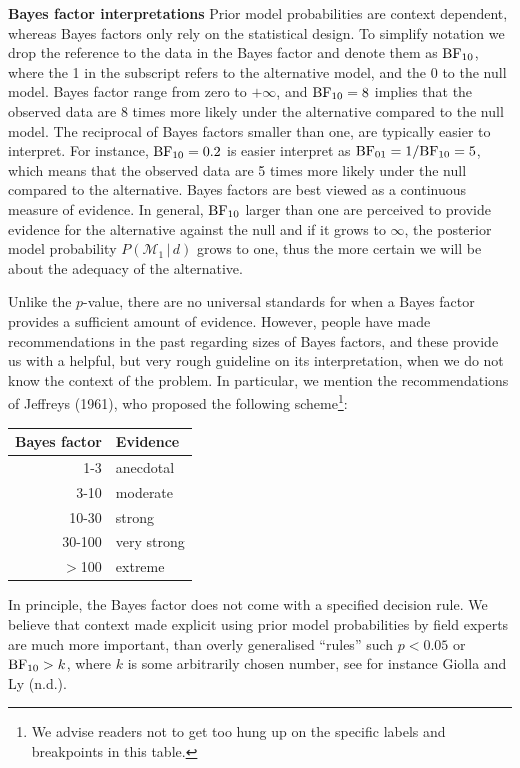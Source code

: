 \documentclass[english,,doc,floatsintext]{apa6}
\let\rmarkdownfootnote\footnote%
\def\footnote{\protect\rmarkdownfootnote}
\begin{document}
\textbf{Bayes factor interpretations}
Prior model probabilities are context dependent, whereas Bayes factors only rely on the statistical design. To simplify notation we drop the reference to the data in the Bayes factor and denote them as \(\textnormal{BF}_{10}\), where the 1 in the subscript refers to the alternative model, and the 0 to the null model. Bayes factor range from zero to \(+ \infty\), and \(\textnormal{BF}_{10} = 8\) implies that the observed data are 8 times more likely under the alternative compared to the null model. The reciprocal of Bayes factors smaller than one, are typically easier to interpret. For instance, \(\textnormal{BF}_{10} = 0.2\) is easier interpret as \(\textnormal{BF}_{01} = 1/\textnormal{BF}_{10} = 5\), which means that the observed data are 5 times more likely under the null compared to the alternative. Bayes factors are best viewed as a continuous measure of evidence. In general, \(\textnormal{BF}_{10}\) larger than one are perceived to provide evidence for the alternative against the null and if it grows to \(\infty\), the posterior model probability \(P(\mathcal{M}_{1} \, | \, d)\) grows to one, thus the more certain we will be about the adequacy of the alternative.

Unlike the \(p\)-value, there are no universal standards for when a Bayes factor provides a sufficient amount of evidence. However, people have made recommendations in the past regarding sizes of Bayes factors, and these provide us with a helpful, but very rough guideline on its interpretation, when we do not know the context of the problem. In particular, we mention the recommendations of Jeffreys (1961), who proposed the following scheme\footnote{We advise readers not to get too hung up on the specific labels and breakpoints in this table.}:

\begin{tabular}{rl}
Bayes factor & Evidence\\
\hline
1-3 & anecdotal\\
3-10 & moderate\\
10-30 & strong\\
30-100 & very strong\\
\( > \)100 & extreme\\
\end{tabular}

In principle, the Bayes factor does not come with a specified decision rule. We believe that context made explicit using prior model probabilities by field experts are much more important, than overly generalised \enquote{rules} such \(p < 0.05\) or \(\textnormal{BF} _{10} > k\), where \(k\) is some arbitrarily chosen number, see for instance Giolla and Ly (n.d.).
\end{document}

